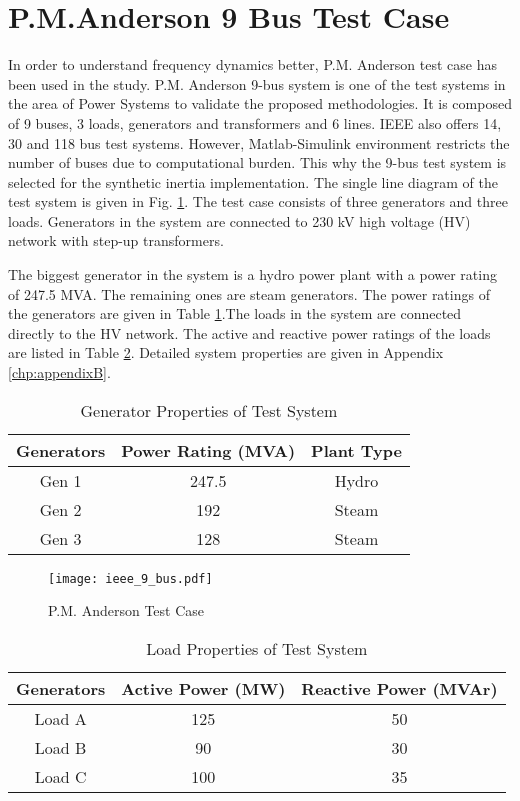 \section{P.M.Anderson 9 Bus Test Case}
In order to understand frequency dynamics better, P.M. Anderson test case has been used in the study. P.M. Anderson 9-bus system is one of the test systems in the area of Power Systems to validate the proposed methodologies. It is composed of 9 buses, 3 loads, generators and transformers and 6 lines. IEEE also offers 14, 30 and 118 bus test systems. However, Matlab-Simulink environment restricts the number of buses due to computational burden. This why the 9-bus test system is selected for the synthetic inertia implementation. The single line diagram of the test system is given in Fig. \ref{ieee_9_bus}. The test case consists of three generators and three loads. Generators in the system are connected to 230 kV high voltage (HV) network with step-up transformers.\par
The biggest generator in the system is a hydro power plant with a power rating of 247.5 MVA. The remaining ones are steam generators. The power ratings of the generators are given in Table \ref{generatorproperties}.The loads in the system are connected directly to the HV network. The active and reactive power ratings of the loads are listed in Table \ref{loadproperties}. Detailed system properties are given in Appendix \ref{chp:appendixB}.
\begin{table}[h]
	\centering
	\begin{tabular}{ccc}
		\hline
		\textbf{Generators} & \textbf{Power Rating (MVA)} & \textbf{Plant Type} \\ \hline
		Gen 1               & 247.5                       & Hydro				\\
		Gen 2               & 192                         & Steam               \\
		Gen 3               & 128                         & Steam               \\ \hline
	\end{tabular}
	\caption{Generator Properties of Test System}
	\label{generatorproperties}
\end{table}
\begin{figure}[h]
	\centering
	\texttt{[image: ieee\_9\_bus.pdf]}
	\caption{P.M. Anderson Test Case \cite{P.M.1995}}
	\label{ieee_9_bus}
\end{figure}
\begin{table}[h!]
	\centering
	\begin{tabular}{ccc}
		\hline
		\textbf{Generators} & \textbf{Active Power (MW)}  & \textbf{Reactive Power (MVAr)} \\ \hline
		Load A              & 125                      	  & 50				 \\
		Load B              & 90                          & 30                \\
		Load C              & 100                         & 35                \\ \hline
	\end{tabular}
	\caption{Load Properties of Test System}
	\label{loadproperties}
\end{table}
